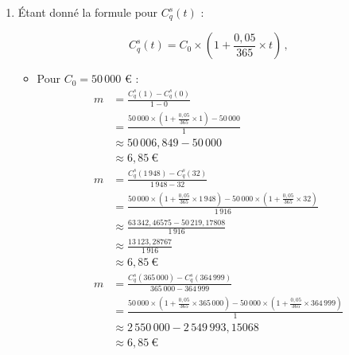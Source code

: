 \documentclass{article}
\begin{document}
\begin{enumerate}[label=\textbf{Q\arabic*.}]
    \item Étant donné la formule pour \( C_q^s(t) \) :

    \[
    C_q^s(t) = C_0 \times \left(1 + \frac{0{,}05}{365} \times t\right)\,,
    \]

    \begin{itemize}
        \item Pour \( C_0 = 50\,000 \) € :
        \[
            \begin{aligned}
            m &= \frac{C^s_q(1) - C^s_q(0)}{1 - 0} \\
              &= \frac{50\,000 \times \left(1 + \frac{0{,}05}{365} \times 1\right) - 50\,000}{1} \\
              &\approx 50\,006{,}849 - 50\,000 \\
              &\approx 6{,}85\ \text{€} \\[1em]
            m &= \frac{C^s_q(1\,948) - C^s_q(32)}{1\,948 - 32} \\
              &= \frac{50\,000 \times \left(1 + \frac{0{,}05}{365} \times 1\,948\right) - 50\,000 \times \left(1 + \frac{0{,}05}{365} \times 32\right)}{1\,916} \\
              &\approx \frac{63\,342{,}46575 - 50\,219{,}17808}{1\,916} \\
              &\approx \frac{13\,123{,}28767}{1\,916} \\
              &\approx 6{,}85\ \text{€} \\[1em]
            m &= \frac{C^s_q(365\,000) - C^s_q(364\,999)}{365\,000 - 364\,999} \\
              &= \frac{50\,000 \times \left(1 + \frac{0{,}05}{365} \times 365\,000\right) - 50\,000 \times \left(1 + \frac{0{,}05}{365} \times 364\,999\right)}{1} \\
              &\approx 2\,550\,000 - 2\,549\,993,15068 \\
              &\approx 6{,}85\ \text{€}
            \end{aligned}
        \]
    

\end{itemize}
\end{enumerate}
\end{document}

